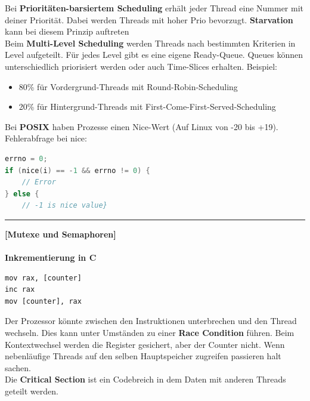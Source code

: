 \documentclass[8pt]{extarticle}
\let\oldtextbf\textbf
\renewcommand{\textbf}{\tiny\oldtextbf}
\begin{document}
\begin{multicols*}{5}
	Bei \textbf{Prioritäten-barsiertem Scheduling} erhält jeder Thread eine Nummer mit deiner Priorität. Dabei werden Threads mit hoher Prio bevorzugt. \textbf{Starvation} kann bei diesem Prinzip auftreten\\
	
	Beim \textbf{Multi-Level Scheduling} werden Threads nach bestimmten Kriterien in Level aufgeteilt. Für jedes Level gibt es eine eigene Ready-Queue. Queues können unterschiedlich priorisiert werden oder auch Time-Slices erhalten. Beispiel:
	\begin{itemize} [noitemsep, topsep=0pt, leftmargin=*]
		\item 80\% für Vordergrund-Threads mit Round-Robin-Scheduling
		\item 20\% für Hintergrund-Threads mit First-Come-First-Served-Scheduling
	\end{itemize}
	
	\vspace{5pt}
	
	Bei \textbf{POSIX} haben Prozesse einen Nice-Wert (Auf Linux von -20 bis +19). Fehlerabfrage bei nice:
	\begin{lstlisting}[language=c]
errno = 0;
if (nice(i) == -1 && errno != 0) {
	// Error
} else {
	// -1 is nice value}
	\end{lstlisting}
	
	\vspace{3pt}
	\rule{\linewidth}{0.4pt}
	\textbf{[Mutexe und Semaphoren]}\\\\
	\textbf{Inkrementierung in C}
	\begin{lstlisting}
mov rax, [counter]
inc rax
mov [counter], rax
	\end{lstlisting}
	Der Prozessor könnte zwischen den Instruktionen unterbrechen und den Thread wechseln. Dies kann unter Umständen zu einer \textbf{Race Condition} führen. Beim Kontextwechsel werden die Register gesichert, aber der Counter nicht. Wenn nebenläufige Threads auf den selben Hauptspeicher zugreifen passieren halt sachen.\\ Die \textbf{Critical Section} ist ein Codebreich in dem Daten mit anderen Threads geteilt werden.\\
	

\end{multicols*}
\end{document}
